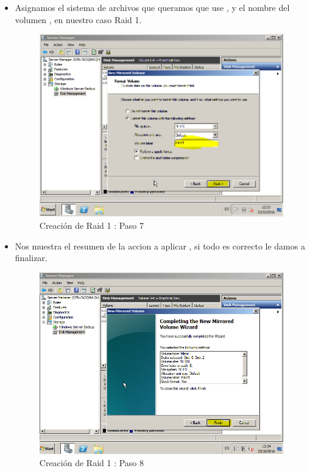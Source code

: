 \begin{itemize}
		\item Asignamos el sistema de archivos que queramos que use , y el nombre del volumen , en nuestro caso Raid 1.	
		\begin{figure}[H] %
			\centering
			\includegraphics[scale=0.5]{pics/Captura7.png}  %
			\caption{Creación de Raid 1 : Paso 7} \label{fig:figura7}
		\end{figure}
	
		\item Nos muestra el resumen de la accion a aplicar , si todo es correcto le damos a finalizar.	
		\begin{figure}[H] %
			\centering
			\includegraphics[scale=0.5]{pics/Captura8.png}  %
			\caption{Creación de Raid 1 : Paso 8} \label{fig:figura8}
		\end{figure}
	

\end{itemize}
